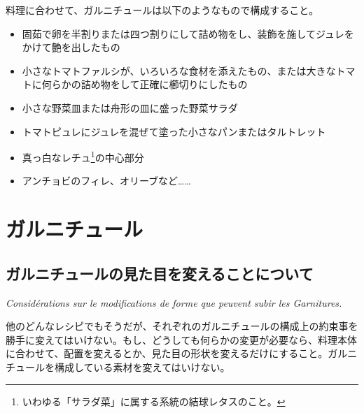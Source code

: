\begin{Main}
料理に合わせて、ガルニチュールは以下のようなもので構成すること。

\begin{itemize}
\tightlist
\item
  固茹で卵を半割りまたは四つ割りにして詰め物をし、装飾を施してジュレをかけて艶を出したもの
\item
  小さなトマトファルシが、いろいろな食材を添えたもの、または大きなトマトに何らかの詰め物をして正確に櫛切りにしたもの
\item
  小さな野菜皿または舟形の皿に盛った野菜サラダ
\item
  トマトピュレにジュレを混ぜて塗った小さなパンまたはタルトレット
\item
  真っ白なレチュ\footnote{いわゆる「サラダ菜」に属する系統の結球レタスのこと。}の中心部分
\item
  アンチョビのフィレ、オリーブなど\ldots{}\ldots{}
\end{itemize}

\newpage

\hypertarget{serie-des-garnitures}{%
\section{ガルニチュール}\label{serie-des-garnitures}}


\hypertarget{consideration-sur-la-modification-de-forme-que-peuvent-subir-les-garniture}{%
\subsection{ガルニチュールの見た目を変えることについて}\label{consideration-sur-la-modification-de-forme-que-peuvent-subir-les-garniture}}

\vspace{-1\zw}
\begin{center}
\textit{Considérations sur le modifications de forme que peuvent subir les Garnitures.}
\end{center}
\vspace{1\zw}


他のどんなレシピでもそうだが、それぞれのガルニチュールの構成上の約束事を勝手に変えてはいけない。もし、どうしても何らかの変更が必要なら、料理本体に合わせて、配置を変えるとか、見た目の形状を変えるだけにすること。ガルニチュールを構成している素材を変えてはいけない。


\end{Main}

